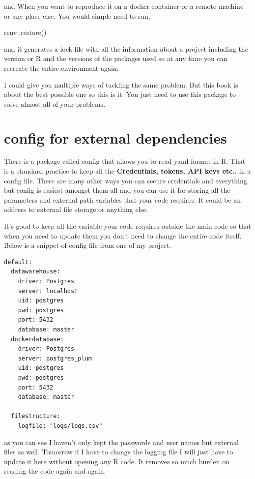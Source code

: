 \documentclass[
]{book}
\newenvironment{Shaded}{\begin{snugshade}}{\end{snugshade}}
\newcommand{\FunctionTok}[1]{\textcolor[rgb]{0.00,0.00,0.00}{#1}}
\newcommand{\NormalTok}[1]{#1}
\newcommand{\SpecialCharTok}[1]{\textcolor[rgb]{0.00,0.00,0.00}{#1}}
\begin{document}
and When you want to reproduce it on a docker container or a remote machine or any place else. You would simple need to run.

\begin{Shaded}
\begin{Highlighting}[]
\NormalTok{renv}\SpecialCharTok{::}\FunctionTok{restore}\NormalTok{()}
\end{Highlighting}
\end{Shaded}

and it generates a lock file with all the information about a project including the version or R and the versions of the packages used so at any time you can recreate the entire environment again.

I could give you multiple ways of tackling the same problem. But this book is about the best possible one so this is it. You just need to use this package to solve almost all of your problems.

\hypertarget{config-for-external-dependencies}{%
\section{config for external dependencies}\label{config-for-external-dependencies}}

There is a package called config that allows you to read yaml format in R. That is a standard practice to keep all the \textbf{Credentials, tokens, API keys etc..} in a config file. There are many other ways you can secure credentials and everything but config is easiest amongst them all and you can use it for storing all the parameters and external path variables that your code requires. It could be an address to external file storage or anything else.

It's good to keep all the variable your code requires outside the main code so that when you need to update them you don't need to change the entire code itself. Below is a snippet of config file from one of my project.

\begin{verbatim}
default:
  datawarehouse:
    driver: Postgres
    server: localhost
    uid: postgres
    pwd: postgres
    port: 5432
    database: master
  dockerdatabase:
    driver: Postgres
    server: postgres_plum
    uid: postgres
    pwd: postgres
    port: 5432
    database: master

  filestructure:
    logfile: "logs/logs.csv"
\end{verbatim}

as you can see I haven't only kept the passwords and user names but external files as well. Tomorrow if I have to change the logging file I will just have to update it here without opening any R code. It removes so much burden on reading the code again and again.
\end{document}

